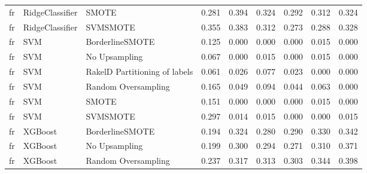 \begin{tabular}{lllllllll}
      fr &                 RidgeClassifier &                         SMOTE & 0.281 &                     0.394 &                 0.324 &                  0.292 &                                   0.312 &     0.324 \\
      fr &                 RidgeClassifier &                      SVMSMOTE & 0.355 &                     0.383 &                 0.312 &                  0.273 &                                   0.288 &     0.328 \\
      fr &                             SVM &               BorderlineSMOTE & 0.125 &                     0.000 &                 0.000 &                  0.000 &                                   0.015 &     0.000 \\
      fr &                             SVM &                 No Upsampling & 0.067 &                     0.000 &                 0.015 &                  0.000 &                                   0.015 &     0.000 \\
      fr &                             SVM & RakelD Partitioning of labels & 0.061 &                     0.026 &                 0.077 &                  0.023 &                                   0.000 &     0.000 \\
      fr &                             SVM &           Random Oversampling & 0.165 &                     0.049 &                 0.094 &                  0.044 &                                   0.063 &     0.000 \\
      fr &                             SVM &                         SMOTE & 0.151 &                     0.000 &                 0.000 &                  0.000 &                                   0.015 &     0.000 \\
      fr &                             SVM &                      SVMSMOTE & 0.297 &                     0.014 &                 0.015 &                  0.000 &                                   0.000 &     0.015 \\
      fr &                         XGBoost &               BorderlineSMOTE & 0.194 &                     0.324 &                 0.280 &                  0.290 &                                   0.330 &     0.342 \\
      fr &                         XGBoost &                 No Upsampling & 0.199 &                     0.300 &                 0.294 &                  0.271 &                                   0.310 &     0.371 \\
      fr &                         XGBoost &           Random Oversampling & 0.237 &                     0.317 &                 0.313 &                  0.303 &                                   0.344 &     0.398 \\

\end{tabular}
